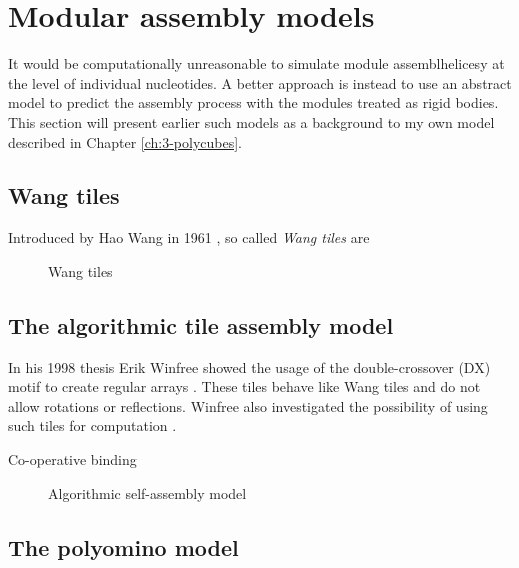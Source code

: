 \section{Modular assembly models}
It would be computationally unreasonable to simulate module assemblhelicesy at the level of individual nucleotides. A better approach is instead to use an abstract model to predict the assembly process with the modules treated as rigid bodies. This section will present earlier such models as a background to my own model described in Chapter \ref{ch:3-polycubes}.

\subsection{Wang tiles}
Introduced by Hao Wang in 1961 \cite{wang1961proving}, so called \emph{Wang tiles} are 

\begin{figure}[h]
  \centering
  \caption{Wang tiles}
\end{figure}

\subsection{The algorithmic tile assembly model}



In his 1998 thesis Erik Winfree showed the usage of the double-crossover (DX) motif to create regular arrays \cite{winfree1998design}. These tiles behave like Wang tiles\cite{wang1961proving} and do not allow rotations or reflections. Winfree also investigated the possibility of using such tiles for computation \cite{winfree1998algorithmic}.

Co-operative binding

\begin{figure}[h]
  \centering
  \caption{Algorithmic self-assembly model}
\end{figure}

\subsection{The polyomino model}\label{sec:polyomino}

